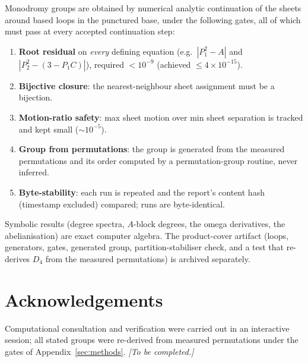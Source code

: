 \documentclass[11pt]{article}
\theoremstyle{plain}
\theoremstyle{definition}
\theoremstyle{remark}
\begin{document}
Monodromy groups are obtained by numerical analytic continuation of the sheets
around based loops in the punctured base, under the following gates, all of which
must pass at every accepted continuation step:
\begin{enumerate}[leftmargin=1.4em,nosep]
\item \textbf{Root residual} on \emph{every} defining equation
(e.g.\ $|P_1^2-A|$ and $|P_2^2-(3-P_1C)|$), required $<10^{-9}$ (achieved
$\le4\times10^{-15}$).
\item \textbf{Bijective closure}: the nearest-neighbour sheet assignment must be a
bijection.
\item \textbf{Motion-ratio safety}: max sheet motion over min sheet separation is
tracked and kept small ($\sim10^{-5}$).
\item \textbf{Group from permutations}: the group is generated from the measured
permutations and its order computed by a permutation-group routine, never inferred.
\item \textbf{Byte-stability}: each run is repeated and the report's
content hash (timestamp excluded) compared; runs are byte-identical.
\end{enumerate}
Symbolic results (degree spectra, $A$-block degrees, the omega derivatives, the
abelianisation) are exact computer algebra. The product-cover artifact (loops,
generators, gates, generated group, partition-stabiliser check, and a test that
re-derives $D_4$ from the measured permutations) is archived separately.

\section*{Acknowledgements}
Computational consultation and verification were carried out in an interactive
session; all stated groups were re-derived from measured permutations under the
gates of Appendix~\ref{sec:methods}. \emph{[To be completed.]}
\end{document}
